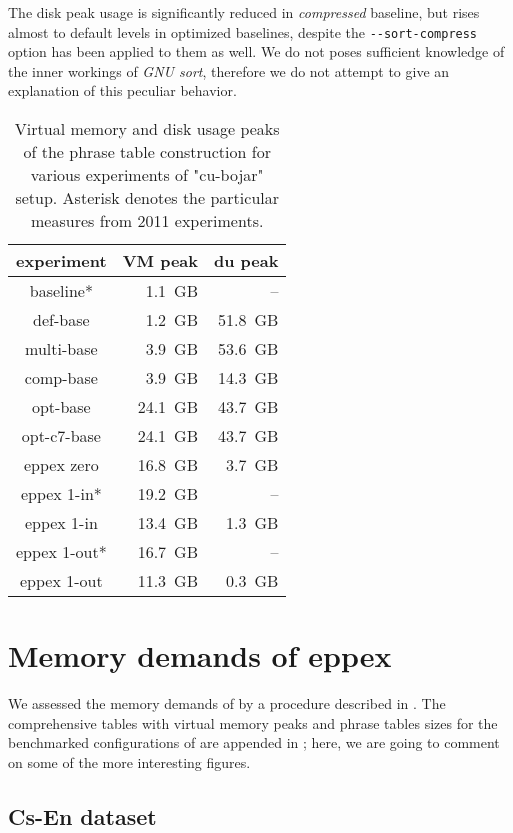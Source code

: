 The disk peak usage is significantly reduced in \emph{compressed} baseline, but rises almost to
default levels in optimized baselines, despite the \verb|--sort-compress| option has been applied
to them as well.
We do not poses sufficient knowledge of the inner workings of \emph{GNU sort}, therefore we do not
attempt to give an explanation of this peculiar behavior.

\begin{table}[ht]
\centering
\begin{tabular}{ | c | r | r | }
\hline
experiment & VM peak & du peak \\
\hline
\hline
baseline*     &  1.1~GB &      -- \\
def-base      &  1.2~GB & 51.8~GB \\
multi-base    &  3.9~GB & 53.6~GB \\
comp-base     &  3.9~GB & 14.3~GB \\
opt-base      & 24.1~GB & 43.7~GB \\
opt-c7-base   & 24.1~GB & 43.7~GB \\
eppex zero    & 16.8~GB &  3.7~GB \\
\hline
eppex 1-in*   & 19.2~GB &      -- \\
eppex 1-in    & 13.4~GB &  1.3~GB \\
\hline
eppex 1-out*  & 16.7~GB &      -- \\
eppex 1-out   & 11.3~GB &  0.3~GB \\
\hline
\end{tabular}
\caption{\label{cu-bojar-vm-and-du-peaks}
Virtual memory and disk usage peaks of the phrase table construction for various experiments
of "cu-bojar" setup. Asterisk denotes the particular measures from 2011 experiments.}
\end{table}

\section{Memory demands of eppex}
\label{sec:eppex-memory-demands}

We assessed the memory demands of \eppex{} by a procedure described in .
The comprehensive tables with virtual memory peaks and phrase tables sizes for the benchmarked
configurations of \eppex{} are appended in ; here, we are going
to comment on some of the more interesting figures.

\subsection{Cs-En dataset}

